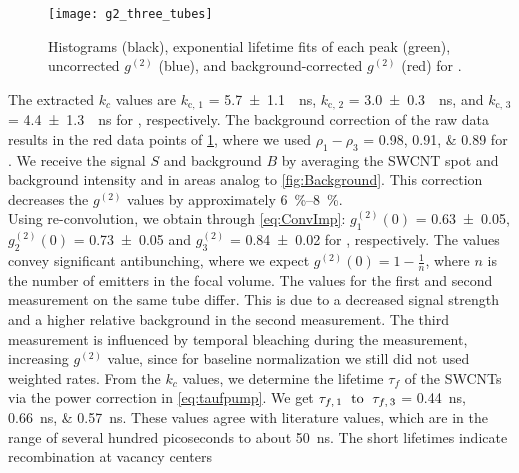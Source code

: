 \begin{figure}[h!]
	\centering
	\texttt{[image: g2\_three\_tubes]}
	\caption{Histograms (black), exponential lifetime fits of each peak (green), uncorrected $g^{(2)}$ (blue), and background-corrected $g^{(2)}$ (red) for .}
	\label{fig:g2_bgcorrected_max}
\end{figure}
\noindent The extracted $k_c$ values are $k_\mathrm{c,\,1}$ = \SI{5.7\pm1.1}{\per\ns}, $k_\mathrm{c,\,2}$ = \SI{3.0\pm0.3}{\per\ns}, and $k_\mathrm{c,\,3}$ = \SI{4.4\pm1.3}{\per\ns} for , respectively. The background correction of the raw data results in the red data points of \cref{fig:g2_bgcorrected_max}, where we used $\rho_1-\rho_3$ = \numlist{0.98;0.91;0.89} for . We receive the signal $S$ and background $B$ by averaging the \ac{SWCNT} spot and background intensity and in areas analog to \cref{fig:Background}. This correction decreases the $g^{(2)}$ values by approximately \SIrange{6}{8}{\percent}.\\
Using re-convolution, we obtain through \cref{eq:ConvImp}: $g^{(2)}_{1}(0)$ = \num{0.63\pm0.05}, $g^{(2)}_{2}(0)$ = \num{0.73\pm0.05} and $g^{(2)}_{3}$ = \num{0.84\pm0.02} for , respectively. The values convey significant antibunching, where we expect $g^{(2)}(0)=1-\frac{1}{n}$, where $n$ is the number of emitters in the focal volume. The values for the first and second measurement on the same tube differ. This is due to a decreased signal strength and a higher relative background in the second measurement. The third measurement is influenced by temporal bleaching during the measurement, increasing $g^{(2)}$ value, since for baseline normalization we still did not used weighted rates. From the $k_c$ values, we determine the lifetime $\tau_f$ of the \acp{SWCNT} via the power correction in \cref{eq:taufpump}. We get $\tau_{f,\,1}\textrm{\; to \;}\tau_{f,\,3}$ = \SIlist[list-units = brackets]{0.44;0.66;0.57}{\ns}. These values agree with literature values, which are in the range of several hundred picoseconds to about \SI{50}{\ns}. The short lifetimes indicate recombination at vacancy centers \cite{zaumseil_luminescent_2022}\\





